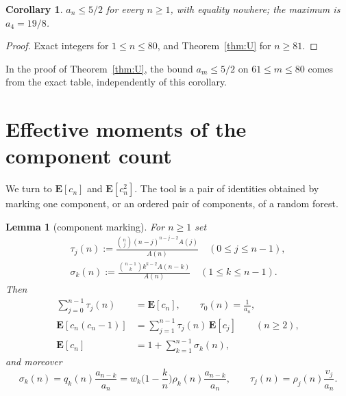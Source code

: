 \documentclass[11pt,a4paper]{amsart}
\theoremstyle{plain}
\newtheorem{lemma}[theorem]{Lemma}
\newtheorem{corollary}[theorem]{Corollary}
\theoremstyle{definition}
\newcommand{\EX}{\mathbf{E}}
\begin{document}
\begin{corollary}\label{cor:52}
$a_n \le 5/2$ for every $n \ge 1$, with equality nowhere; the maximum is
$a_4 = 19/8$.
\end{corollary}

\begin{proof}
Exact integers for $1 \le n \le 80$, and Theorem~\ref{thm:U} for $n \ge 81$.
\end{proof}

In the proof of Theorem~\ref{thm:U}, the bound $a_m\le5/2$ on
$61\le m\le80$ comes from the exact table, independently of this corollary.

\section{Effective moments of the component count}\label{sec:moments}

We turn to $\EX[c_n]$ and $\EX[c_n^2]$. The tool is a pair of identities obtained
by marking one component, or an ordered pair of components, of a random forest.

\begin{lemma}[component marking]\label{lem:mark}
For $n \ge 1$ set
\begin{gather*}
  \tau_j(n) := \frac{\binom{n}{j}(n-j)^{n-j-2}A(j)}{A(n)}\quad (0 \le j \le n-1),\\[4pt]
  \sigma_k(n) := \frac{\binom{n-1}{k}k^{k-2}A(n-k)}{A(n)}\quad (1 \le k \le n-1).
\end{gather*}
Then
\begin{align}
  \sum_{j=0}^{n-1}\tau_j(n) &= \EX[c_n],
    \qquad \tau_0(n) = \frac{1}{a_n}, \label{eq:markI}\\
  \EX[c_n(c_n-1)] &= \sum_{j=1}^{n-1}\tau_j(n)\,\EX[c_j] \qquad (n \ge 2),
    \label{eq:markII}\\
  \EX[c_n] &= 1+\sum_{k=1}^{n-1}\sigma_k(n), \label{eq:markIII}
\end{align}
and moreover
\begin{equation}\label{eq:sigmatau}
  \sigma_k(n) = q_k(n)\frac{a_{n-k}}{a_n}
              = w_k\Big(1-\frac{k}{n}\Big)\rho_k(n)\frac{a_{n-k}}{a_n},
  \qquad
  \tau_j(n) = \rho_j(n)\frac{v_j}{a_n} .
\end{equation}
\end{lemma}
\end{document}
